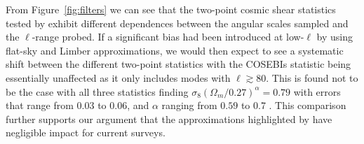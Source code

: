 From Figure~\ref{fig:filters} we can see that the two-point cosmic shear statistics tested by \citet{kilbinger/etal:2013} exhibit different dependences between the angular scales sampled and the $\ell$-range probed.   
If a significant bias had been introduced at low-$\ell$ by using flat-sky and Limber approximations, we would then expect to see a systematic shift between the different two-point statistics with the COSEBIs statistic being essentially unaffected as it only includes modes with $\ell \gtrsim 80$.  This is found not to be the case with all three statistics finding $\sigma_8 (\Omega_m/0.27)^\alpha = 0.79$ with errors that range from $0.03$ to $0.06$, and $\alpha$ ranging from $0.59$ to 0.7 \citep[see Table 5 of][]{kilbinger/etal:2013}.  This comparison further supports our argument that the approximations highlighted by \citet{kitching/etal:2016} have negligible impact for current surveys.


